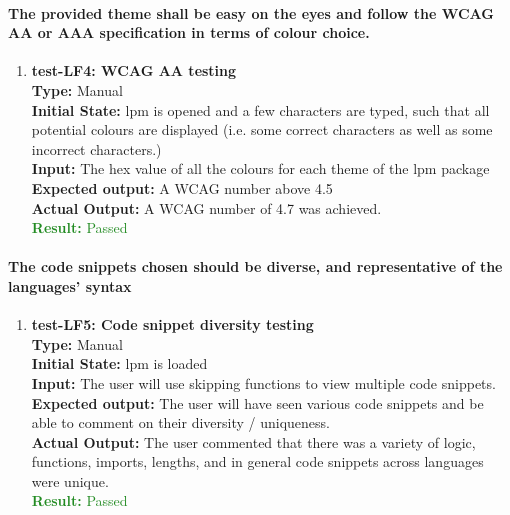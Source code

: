 \documentclass[12pt, titlepage]{article}
\begin{document}
\paragraph{The provided theme shall be easy on the eyes and follow the WCAG AA or AAA
specification in terms of colour choice.}
\begin{enumerate}
    \item{\textbf{test-LF4: WCAG AA testing}\\}
    \textbf{Type:} Manual\\
    \textbf{Initial State:}  lpm is opened and a few characters are typed, such that all potential colours are displayed (i.e. some correct characters as well as some incorrect characters.)\\
    \textbf{Input:} The hex value of all the colours for each theme of the lpm package\\
    \textbf{Expected output: }A WCAG number above 4.5\\
    \textbf{Actual Output:} A WCAG number of 4.7 was achieved. \\
    \textcolor{ForestGreen}{\textbf{Result:} Passed}
\end{enumerate}

\paragraph{The code snippets chosen should be diverse, and representative of the languages’ syntax}
\begin{enumerate}
    \item{\textbf{test-LF5: Code snippet diversity testing}\\}
    \textbf{Type:} Manual\\
    \textbf{Initial State:}  lpm is loaded\\
    \textbf{Input:} The user will use skipping functions to view multiple code snippets.\\
    \textbf{Expected output: } The user will have seen various code snippets and be able to comment on their diversity / uniqueness. \\
    \textbf{Actual Output:} The user commented that there was a variety of logic, functions, imports, lengths, and in general code snippets across languages were unique. \\
    \textcolor{ForestGreen}{\textbf{Result:} Passed}
\end{enumerate}
\end{document}
